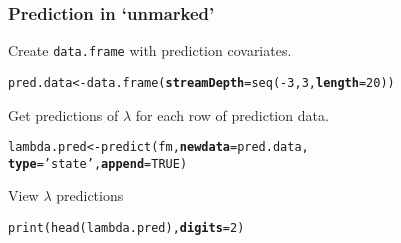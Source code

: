 \documentclass[color=usenames,dvipsnames]{beamer}\usepackage[]{graphicx}\usepackage[]{color}
\makeatletter
\newcommand{\hlnum}[1]{\textcolor[rgb]{0.69,0.494,0}{#1}}%
\newcommand{\hlstr}[1]{\textcolor[rgb]{0.749,0.012,0.012}{#1}}%
\newcommand{\hlopt}[1]{\textcolor[rgb]{0,0,0}{#1}}%
\newcommand{\hlstd}[1]{\textcolor[rgb]{0,0,0}{#1}}%
\newcommand{\hlkwb}[1]{\textcolor[rgb]{0,0.341,0.682}{#1}}%
\newcommand{\hlkwc}[1]{\textcolor[rgb]{0,0,0}{\textbf{#1}}}%
\newcommand{\hlkwd}[1]{\textcolor[rgb]{0.004,0.004,0.506}{#1}}%
\newenvironment{kframe}{%
 \def\at@end@of@kframe{}%
 \ifinner\ifhmode%
  \def\at@end@of@kframe{\end{minipage}}%
  \begin{minipage}{\columnwidth}%
 \fi\fi%
 \def\FrameCommand##1{\hskip\@totalleftmargin \hskip-\fboxsep
 \colorbox{shadecolor}{##1}\hskip-\fboxsep
     \hskip-\linewidth \hskip-\@totalleftmargin \hskip\columnwidth}%
 \MakeFramed {\advance\hsize-\width
   \@totalleftmargin\z@ \linewidth\hsize
   \@setminipage}}%
 {\par\unskip\endMakeFramed%
 \at@end@of@kframe}
\newenvironment{knitrout}{}{} %
\makeatother
\begin{document}
\begin{frame}[fragile]
  \frametitle{Prediction in `unmarked'}
  \small
  Create \texttt{data.frame} with prediction covariates. 
  \vspace{-6pt}
\begin{knitrout}\footnotesize
{}\color{fgcolor}\begin{kframe}
\begin{alltt}
\hlstd{pred.data} \hlkwb{<-} \hlkwd{data.frame}\hlstd{(}\hlkwc{streamDepth}\hlstd{=}\hlkwd{seq}\hlstd{(}\hlopt{-}\hlnum{3}\hlstd{,} \hlnum{3}\hlstd{,} \hlkwc{length}\hlstd{=}\hlnum{20}\hlstd{))}
\end{alltt}
\end{kframe}
\end{knitrout}
\pause
\vfill
Get predictions of $\lambda$ for each row of prediction data.
  \vspace{-6pt}
\begin{knitrout}\footnotesize
{}\color{fgcolor}\begin{kframe}
\begin{alltt}
\hlstd{lambda.pred} \hlkwb{<-} \hlkwd{predict}\hlstd{(fm,} \hlkwc{newdata}\hlstd{=pred.data,}
                       \hlkwc{type}\hlstd{=}\hlstr{'state'}\hlstd{,} \hlkwc{append}\hlstd{=}\hlnum{TRUE}\hlstd{)}
\end{alltt}


{\ttfamily\noindent\bfseries\color{errorcolor}{\#\# Error in h(simpleError(msg, call)): error in evaluating the argument 'object' in selecting a method for function 'predict': object 'fm' not found}}\end{kframe}
\end{knitrout}
\pause
\vfill
  View $\lambda$ predictions
  \vspace{-6pt}
\begin{knitrout}\footnotesize
{}\color{fgcolor}\begin{kframe}
\begin{alltt}
\hlkwd{print}\hlstd{(}\hlkwd{head}\hlstd{(lambda.pred),} \hlkwc{digits}\hlstd{=}\hlnum{2}\hlstd{)}
\end{alltt}


{\ttfamily\noindent\bfseries\color{errorcolor}{\#\# Error in h(simpleError(msg, call)): error in evaluating the argument 'x' in selecting a method for function 'head': object 'lambda.pred' not found}}\end{kframe}
\end{knitrout}
\end{frame}
\end{document}
